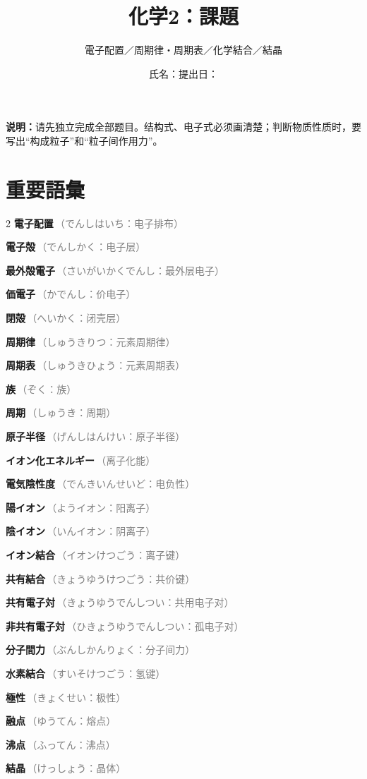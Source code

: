 \documentclass[11pt,a4paper]{ctexart}
\title{\color{JapanBlue}\bfseries 化学2：課題}
\author{電子配置／周期律・周期表／化学結合／結晶}
\date{氏名：\blank{45mm}\qquad 提出日：\blank{28mm}}
\newcommand{\vocab}[2]{\textcolor{JapanBlue}{\textbf{#1}}\,\textcolor{gray}{\footnotesize（#2）}}
\begin{document}
\maketitle
\begin{center}
\colorbox{SoftBlue}{\parbox{.91\linewidth}{
\textbf{说明：}请先独立完成全部题目。结构式、电子式必须画清楚；判断物质性质时，要写出“构成粒子”和“粒子间作用力”。
}}
\end{center}

\section*{重要語彙}
\small
\begin{multicols}{2}
\vocab{電子配置}{でんしはいち：电子排布}\par
\vocab{電子殻}{でんしかく：电子层}\par
\vocab{最外殻電子}{さいがいかくでんし：最外层电子}\par
\vocab{価電子}{かでんし：价电子}\par
\vocab{閉殻}{へいかく：闭壳层}\par
\vocab{周期律}{しゅうきりつ：元素周期律}\par
\vocab{周期表}{しゅうきひょう：元素周期表}\par
\vocab{族}{ぞく：族}\par
\vocab{周期}{しゅうき：周期}\par
\vocab{原子半径}{げんしはんけい：原子半径}\par
\vocab{イオン化エネルギー}{离子化能}\par
\vocab{電気陰性度}{でんきいんせいど：电负性}\par
\vocab{陽イオン}{ようイオン：阳离子}\par
\vocab{陰イオン}{いんイオン：阴离子}\par
\vocab{イオン結合}{イオンけつごう：离子键}\par
\vocab{共有結合}{きょうゆうけつごう：共价键}\par
\vocab{共有電子対}{きょうゆうでんしつい：共用电子对}\par
\vocab{非共有電子対}{ひきょうゆうでんしつい：孤电子对}\par
\vocab{分子間力}{ぶんしかんりょく：分子间力}\par
\vocab{水素結合}{すいそけつごう：氢键}\par
\vocab{極性}{きょくせい：极性}\par
\vocab{融点}{ゆうてん：熔点}\par
\vocab{沸点}{ふってん：沸点}\par
\vocab{結晶}{けっしょう：晶体}\par
\end{multicols}
\normalsize
\end{document}

